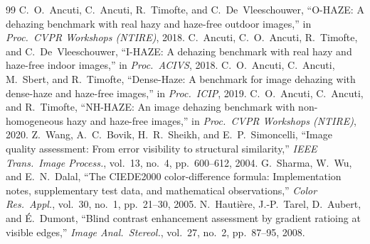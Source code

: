\documentclass[conference]{IEEEtran}
\begin{document}
\begin{thebibliography}{99}
 C.~O.~Ancuti, C.~Ancuti, R.~Timofte, and C.~De~Vleeschouwer, ``O-HAZE: A dehazing benchmark with real hazy and haze-free outdoor images,'' in \emph{Proc.\ CVPR Workshops (NTIRE)}, 2018.
 C.~Ancuti, C.~O.~Ancuti, R.~Timofte, and C.~De~Vleeschouwer, ``I-HAZE: A dehazing benchmark with real hazy and haze-free indoor images,'' in \emph{Proc.\ ACIVS}, 2018.
 C.~O.~Ancuti, C.~Ancuti, M.~Sbert, and R.~Timofte, ``Dense-Haze: A benchmark for image dehazing with dense-haze and haze-free images,'' in \emph{Proc.\ ICIP}, 2019.
 C.~O.~Ancuti, C.~Ancuti, and R.~Timofte, ``NH-HAZE: An image dehazing benchmark with non-homogeneous hazy and haze-free images,'' in \emph{Proc.\ CVPR Workshops (NTIRE)}, 2020.
 Z.~Wang, A.~C.~Bovik, H.~R.~Sheikh, and E.~P.~Simoncelli, ``Image quality assessment: From error visibility to structural similarity,'' \emph{IEEE Trans.\ Image Process.}, vol.~13, no.~4, pp.~600--612, 2004.
 G.~Sharma, W.~Wu, and E.~N.~Dalal, ``The CIEDE2000 color-difference formula: Implementation notes, supplementary test data, and mathematical observations,'' \emph{Color Res.\ Appl.}, vol.~30, no.~1, pp.~21--30, 2005.
 N.~Hauti\`ere, J.-P.~Tarel, D.~Aubert, and \'E.~Dumont, ``Blind contrast enhancement assessment by gradient ratioing at visible edges,'' \emph{Image Anal.\ Stereol.}, vol.~27, no.~2, pp.~87--95, 2008.
\end{thebibliography}
\end{document}
